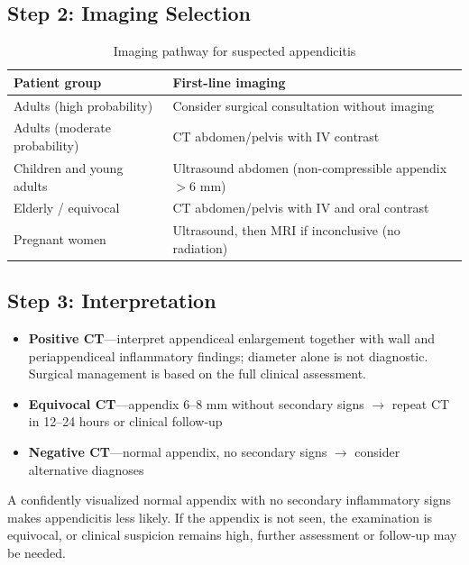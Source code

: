 \subsection{Step 2: Imaging Selection}

\begin{table}[h]
\centering
\caption{Imaging pathway for suspected appendicitis}
\begin{tabular}{|p{}|p{}|}
\hline
\textbf{Patient group} & \textbf{First-line imaging} \\
\hline
Adults (high probability) & Consider surgical consultation without imaging \\
\hline
Adults (moderate probability) & CT abdomen/pelvis with IV contrast \\
\hline
Children and young adults & Ultrasound abdomen (non-compressible appendix $>6$ mm) \\
\hline
Elderly / equivocal & CT abdomen/pelvis with IV and oral contrast \\
\hline
Pregnant women & Ultrasound, then MRI if inconclusive (no radiation) \\
\hline
\end{tabular}
\end{table}

\subsection{Step 3: Interpretation}
\begin{itemize}
    \item \textbf{Positive CT}---interpret appendiceal enlargement together with wall and periappendiceal inflammatory findings; diameter alone is not diagnostic. Surgical management is based on the full clinical assessment.
    \item \textbf{Equivocal CT}---appendix 6--8 mm without secondary signs $\rightarrow$ repeat CT in 12--24 hours or clinical follow-up
    \item \textbf{Negative CT}---normal appendix, no secondary signs $\rightarrow$ consider alternative diagnoses
\end{itemize}

\begin{pearlbox}
A confidently visualized normal appendix with no secondary inflammatory signs makes appendicitis less likely. If the appendix is not seen, the examination is equivocal, or clinical suspicion remains high, further assessment or follow-up may be needed.
\end{pearlbox}


